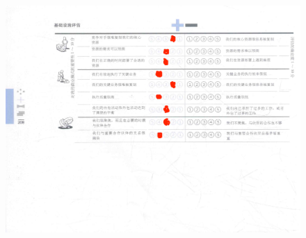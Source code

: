 \documentclass[a4paper,12pt]{article}
\begin{document}
    \begin{figure}[htbp]
        \centering
        \includegraphics[width=15cm,height=25cm]{S&W2.png}
    \end{figure}
   
\end{document}
